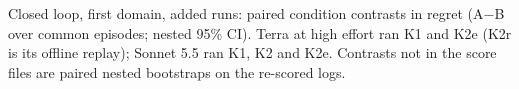 \begin{table}[!htbp]
\centering
\caption{Closed loop, first domain, added runs: paired condition contrasts in regret (A$-$B over common episodes; nested 95\% CI). Terra at high effort ran K1 and K2e (K2r is its offline replay); Sonnet 5.5 ran K1, K2 and K2e. Contrasts not in the score files are paired nested bootstraps on the re-scored logs.}
\label{tab:agent-llm-added-contrasts}
\scriptsize
\setlength{\tabcolsep}{3pt}
\resizebox{\linewidth}{!}{}
\end{table}
